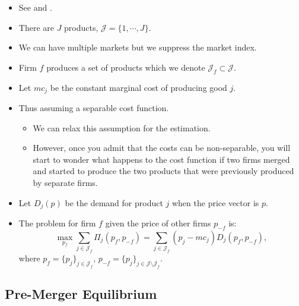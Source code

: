 \documentclass[
]{book}
\providecommand{\tightlist}{%
  \setlength{\itemsep}{0pt}\setlength{\parskip}{0pt}}
\begin{document}
\begin{itemize}
\tightlist
\item
  See \citet{Nevo2000c} and \citet{Nevo2001}.
\item
  There are \(J\) products, \(\mathcal{J} = \{1, \cdots, J\}\).
\item
  We can have multiple markets but we suppress the market index.
\item
  Firm \(f\) produces a set of products which we denote \(\mathcal{J}_f \subset \mathcal{J}\).
\item
  Let \(mc_j\) be the constant marginal cost of producing good \(j\).
\item
  Thus assuming a separable cost function.

  \begin{itemize}
  \tightlist
  \item
    We can relax this assumption for the estimation.
  \item
    However, once you admit that the costs can be non-separable, you will start to wonder what happens to the cost function if two firms merged and started to produce the two products that were previously produced by separate firms.
  \end{itemize}
\item
  Let \(D_j(p)\) be the demand for product \(j\) when the price vector is \(p\).
\item
  The problem for firm \(f\) given the price of other firms \(p_{-f}\) is:
  \begin{equation}
  \max_{p_f} \sum_{j \in \mathcal{J}_f} \Pi_j(p_f, p_{-f}) = \sum_{j \in \mathcal{J}_f} (p_j - mc_j) D_j(p_f, p_{-f}),
  \end{equation}
  where \(p_f = \{p_j\}_{j \in \mathcal{J}_f}\), \(p_{-f} = \{p_j\}_{j \in \mathcal{J} \setminus \mathcal{J}_f}\).
\end{itemize}

\hypertarget{pre-merger-equilibrium}{%
\subsection{Pre-Merger Equilibrium}\label{pre-merger-equilibrium}}
\end{document}
